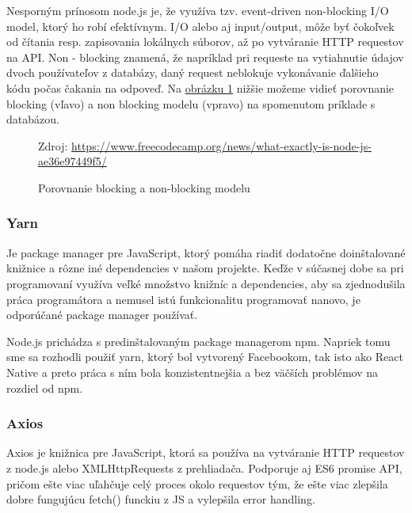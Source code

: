 Nesporným prínosom node.js je, že využíva tzv. event-driven non-blocking I/O model, ktorý ho robí efektívnym. I/O alebo aj input/output, môže byť čokoľvek od čítania resp. zapisovania lokálnych súborov, až po vytváranie HTTP requestov na API. Non - blocking znamená, že napríklad pri requeste na vytiahnutie údajov dvoch používateľov z databázy, daný request neblokuje vykonávanie ďalšieho kódu počas čakania na odpoveď. Na \hyperref[nodejsImg]{ obrázku \ref{nodejsImg}} nižšie možeme vidieť porovnanie blocking (vľavo) a non blocking modelu (vpravo) na spomenutom príklade s databázou. \\

\begin{figure}[!htbp]
  \centering  
  \def\stackalignment{c}
           {\scriptsize%
            Zdroj: \url{https://www.freecodecamp.org/news/what-exactly-is-node-js-ae36e97449f5/}}
	\caption{Porovnanie blocking a non-blocking modelu}  
  \label{nodejsImg}
\end{figure}

\subsubsection{Yarn}
Je package manager pre JavaScript, ktorý pomáha riadiť dodatočne doinštalované knižnice a rôzne iné dependencies v našom projekte. Keďže v súčasnej dobe sa pri programovaní využíva veľké množstvo knižníc a dependencies, aby sa zjednodušila práca programátora a nemusel istú funkcionalitu programovať nanovo, je odporúčané package manager používať. 

Node.js prichádza s predinštalovaným package managerom npm. Napriek tomu sme sa rozhodli použiť yarn, ktorý bol vytvorený Facebookom, tak isto ako React Native a preto práca s ním bola konzistentnejšia a bez väčších problémov na rozdiel od npm. \\
\subsubsection{Axios}
Axios je knižnica pre JavaScript, ktorá sa používa na vytváranie HTTP requestov z node.js alebo XMLHttpRequests z prehliadača. Podporuje aj ES6 promise API, pričom ešte viac uľahčuje celý proces okolo requestov tým, že ešte viac zlepšila dobre fungujúcu fetch() funckiu z JS a vylepšila error handling. \\


